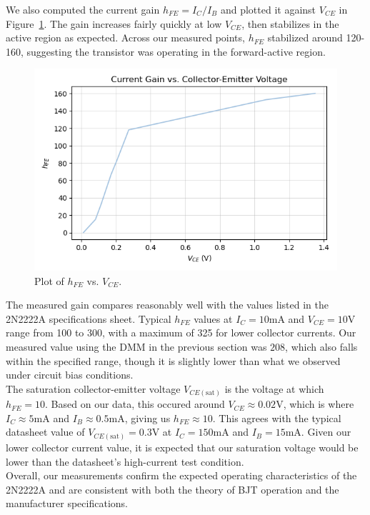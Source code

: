 \documentclass{article}
\begin{document}
\noindent We also computed the current gain $h_{FE}=I_C / I_B$ and plotted it
against $V_{CE}$ in Figure~\ref{fig:hfe_vs_vce}. The gain increases fairly
quickly at low $V_{CE}$, then stabilizes in the active region as expected.
Across our measured points, $h_{FE}$ stabilized around 120-160, suggesting the
transistor was operating in the forward-active region.

\begin{figure}[H]
    \centering
    \includegraphics[width=0.75\linewidth]{5.2b.png}
    \caption{Plot of $h_{FE}$ vs. $V_{CE}$.}
    \label{fig:hfe_vs_vce}
\end{figure}

\noindent The measured gain compares reasonably well with the values listed
in the 2N2222A specifications sheet. Typical $h_{FE}$ values at $I_C=10\si{\milli\ampere}$
and $V_{CE}=10\si{\volt}$ range from 100 to 300, with a maximum of 325 for lower
collector currents. Our measured value using the DMM in the previous section was $208$, 
which also falls within the specified range, though it is slightly lower than
what we observed under circuit bias conditions.\\

\noindent The saturation collector-emitter voltage $V_{CE(\text{sat})}$ is the voltage at
which $h_{FE}=10$. Based on our data, this occured around $V_{CE}\approx0.02\si{\volt}$,
which is where $I_C\approx5\si{\milli\ampere}$ and $I_B\approx0.5\si{\milli\ampere}$,
giving us $h_{FE}\approx10$. This agrees with the typical datasheet value of
$V_{CE(\text{sat})}=0.3\si{\volt}$ at $I_C=150\si{\milli\ampere}$ and $I_B=15\si{\milli\ampere}$.
Given our lower collector current value, it is expected that our saturation
voltage would be lower than the datasheet's high-current test condition.\\

\noindent Overall, our measurements confirm the expected operating characteristics of the
2N2222A and are consistent with both the theory of BJT operation and the
manufacturer specifications.
\end{document}
